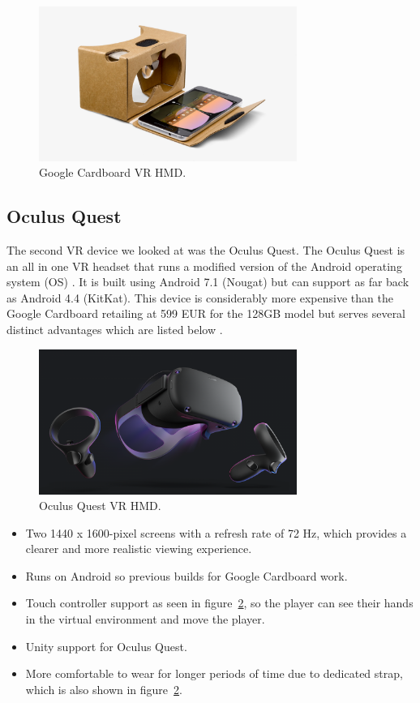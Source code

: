 \begin{figure}[h!]
	\caption{Google Cardboard VR HMD.}
	\label{image:googlevr}
	\centering
	\includegraphics[width=0.75\textwidth]{Images/google_cardboard.jpg}
\end{figure}	

\subsection{Oculus Quest}
The second VR device we looked at was the Oculus Quest. The Oculus Quest is an all in one VR headset that runs a modified version of the Android operating system (OS) \cite{13685558020190801}. It is built using Android 7.1 (Nougat) but can support as far back as Android 4.4 (KitKat). This device is considerably more expensive than the Google Cardboard retailing at 599 EUR for the 128GB model but serves several distinct advantages which are listed below \cite{13685558020190801}.

\begin{figure}[h!]
	\caption{Oculus Quest VR HMD.}
	\label{image:oculusquest}
	\centering
	\includegraphics[width=0.75\textwidth]{Images/oculus_quest.png}
\end{figure}

\begin{itemize}
    \item Two 1440 x 1600-pixel screens with a refresh rate of 72 Hz, which provides a clearer and more realistic viewing experience.
    \item Runs on Android so previous builds for Google Cardboard work.
    \item Touch controller support as seen in figure~\ref{image:oculusquest}, so the player can see their hands in the virtual environment and move the player.
    \item Unity support for Oculus Quest.
    \item More comfortable to wear for longer periods of time due to dedicated strap, which is also shown in figure~\ref{image:oculusquest}.
\end{itemize}

